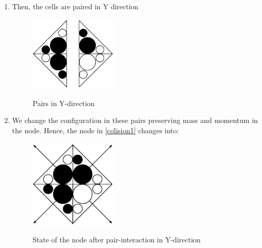 \begin{enumerate}
\item Then, the cells are paired in Y direction
\begin{figure}[H]
 \centering 
 \includegraphics[width=0.4\textwidth]{./img/y-inter}
 \label{yinter}
 \caption{Pairs in Y-direction}
\end{figure}

\item We change the configuration in these pairs preserving mass and momentum in the node. Hence, the node in \ref{colision1} changes into:
 \begin{figure}[H]
 \centering 
 \includegraphics[width=0.4\textwidth]{./img/afterall}
 \label{colision2}
 \caption{State of the node after pair-interaction in Y-direction}
\end{figure}
\newpage
\end{enumerate}


